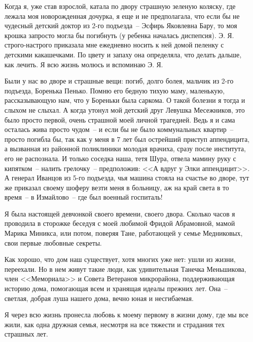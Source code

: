 Когда я, уже став взрослой, катала по двору страшную зеленую коляску, где лежала моя новорожденная дочурка, я еще и не предполагала, что если бы не чудесный детский доктор из 2-го подъезда~-- Эсфирь Яковлевна Бару, то моя крошка запросто могла бы погибнуть (у ребенка началась диспепсия). Э. Я. строго-настрого приказала мне ежедневно носить к ней домой пеленку с детскими какашечками. По цвету и запаху она определяла, что делать дальше, как лечить. Я всю жизнь молюсь и вспоминаю Э. Я.

Были у нас во дворе и страшные вещи: погиб, долго болея, мальчик из 2-го подъезда, Боренька Пенько. Помню его бедную тихую маму, маленькую, рассказывающую нам, что у Бореньки была саркома. О такой болезни я тогда и слыхом не слыхал. А когда утонул мой детский друг Левушка Месежников, это было просто первой, очень страшной моей личной трагедией. Ведь я и сама осталась жива просто чудом~-- и если бы не было коммунальных квартир~-- просто погибла бы, так как у меня в 7 лет был острейший приступ аппендицита, а вызванная из районной поликлиники молодая врачиха, сразу после института, его не распознала. И только соседка наша, тетя Шура, отвела мамину руку с кипятком~-- налить грелочку~-- предположив: <<А вдруг у Элки аппендицит>>. А генерал Иванцов из 5-го подъезда, чья машина стояла на счастье во дворе, тут же приказал своему шоферу везти меня в больницу, аж на край света в то время~-- в Измайлово~-- где был военный госпиталь!

Я была настоящей девчонкой своего времени, своего двора. Сколько часов я проводила в сторожке беседуя с моей любимой Фридой Абрамовной, мамой Марика Миникса, или потом, поверяя Тане, работающей у семье Медниковых, свои первые любовные секреты.

Как хорошо, что дом наш существует, хотя многих уже нет: ушли из жизни, переехали. Но в нем живут такие люди, как удивительная Танечка Меньшикова, член <<Мемориала>> и Совета Ветеранов микрорайона, поддерживающая историю дома, помогающая всем и хранящая идеалы прежних лет. Она~-- светлая, добрая луша нашего дома, вечно юная и несгибаемая.

Я через всю  жизнь пронесла любовь к моему первому в жизни дому, где мы все жили, как одна дружная семья, несмотря на все тяжести и страдания тех страшных лет.

\indent

\begin{figure}[h!]
    \begin{minipage}[t]{70mm}
    \hspace{1pt}
    \end{minipage}
\end{figure}

